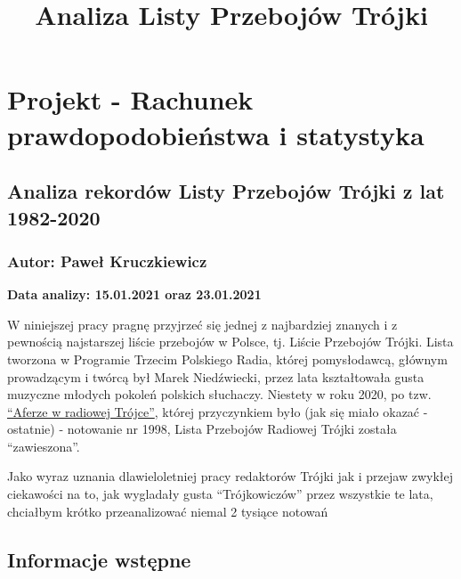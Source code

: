 \documentclass[11pt]{article}
\title{Analiza Listy Przebojów Trójki}
\begin{document}
    
    \maketitle
    
    

    
    \hypertarget{projekt---rachunek-prawdopodobieux144stwa-i-statystyka}{%
\section{Projekt - Rachunek prawdopodobieństwa i
statystyka}\label{projekt---rachunek-prawdopodobieux144stwa-i-statystyka}}

\hypertarget{analiza-rekorduxf3w-listy-przebojuxf3w-truxf3jki-z-lat-1982-2020}{%
\subsection{Analiza rekordów Listy Przebojów Trójki z lat
1982-2020}\label{analiza-rekorduxf3w-listy-przebojuxf3w-truxf3jki-z-lat-1982-2020}}

\hypertarget{autor-paweux142-kruczkiewicz}{%
\subsubsection{Autor: Paweł
Kruczkiewicz}\label{autor-paweux142-kruczkiewicz}}

\textbf{Data analizy: 15.01.2021 oraz 23.01.2021}

    W niniejszej pracy pragnę przyjrzeć się jednej z najbardziej znanych i z
pewnością najstarszej liście przebojów w Polsce, tj. Liście Przebojów
Trójki. Lista tworzona w Programie Trzecim Polskiego Radia, której
pomysłodawcą, głównym prowadzącym i twórcą był Marek Niedźwiecki, przez
lata kształtowała gusta muzyczne młodych pokoleń polskich słuchaczy.
Niestety w roku 2020, po tzw.
\href{https://pl.wikipedia.org/wiki/Polskie_Radio_Program_III\#Sprawa_pojawienia_si\%C4\%99_piosenki_\%E2\%80\%9ETw\%C3\%B3j_b\%C3\%B3l_jest_lepszy_ni\%C5\%BC_m\%C3\%B3j\%E2\%80\%9D_na_Li\%C5\%9Bcie_Przeboj\%C3\%B3w}{``Aferze
w radiowej Trójce''}, której przyczynkiem było (jak się miało okazać -
ostatnie) - notowanie nr 1998, Lista Przebojów Radiowej Trójki została
``zawieszona''.

Jako wyraz uznania dlawieloletniej pracy redaktorów Trójki jak i przejaw
zwykłej ciekawości na to, jak wygladały gusta ``Trójkowiczów'' przez
wszystkie te lata, chciałbym krótko przeanalizować niemal 2 tysiące
notowań

    \hypertarget{informacje-wstux119pne}{%
\subsection{Informacje wstępne}\label{informacje-wstux119pne}}
\end{document}

